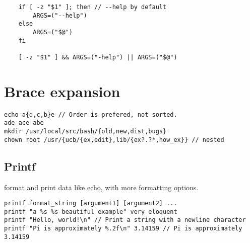 \begin{verbatim}
    if [ -z "$1" ]; then // --help by default
        ARGS=("--help")
    else
        ARGS=("$@")
    fi

    [ -z "$1" ] && ARGS=("-help") || ARGS=("$@")
\end{verbatim}

\section{Brace expansion}

\begin{verbatim}
echo a{d,c,b}e // Order is prefered, not sorted.
ade ace abe
mkdir /usr/local/src/bash/{old,new,dist,bugs}
chown root /usr/{ucb/{ex,edit},lib/{ex?.?*,how_ex}} // nested
\end{verbatim}

\subsection{Printf}

format and print data like echo, with more formatting options.

\begin{verbatim}
printf format_string [argument1] [argument2] ...
printf "a %s %s beautiful example" very eloquent
printf "Hello, world!\n" // Print a string with a newline character
printf "Pi is approximately %.2f\n" 3.14159 // Pi is approximately 3.14159
\end{verbatim}



